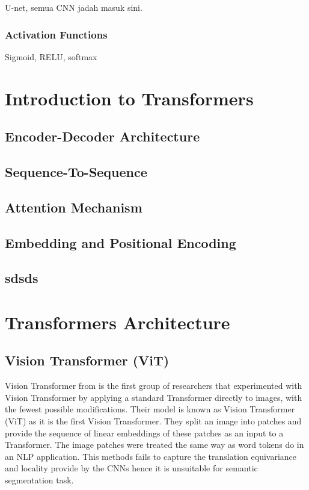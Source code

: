 U-net, semua CNN jadah masuk sini.
\subsubsection{Activation Functions}
Sigmoid, RELU, softmax

\section{Introduction to Transformers}\label{subsection:Intro to Trans}
\subsection{Encoder-Decoder Architecture}
\subsection{Sequence-To-Sequence}
\subsection{Attention Mechanism}
\subsection{Embedding and Positional Encoding}
\subsection{sdsds}\label{sasas}
\section{Transformers Architecture}
\subsection{Vision Transformer (ViT)}
Vision Transformer from \cite{16x16} is the first group of researchers that experimented with Vision Transformer by applying a standard Transformer directly to images, with the fewest possible modifications. Their model is known as Vision Transformer (ViT) as it is the first Vision Transformer. They split an image into patches and provide the sequence of linear embeddings of these patches as an input to a Transformer. The image patches were treated the same way as word tokens do in an NLP application. This methods fails to capture the  translation equivariance and locality provide by the CNNs hence it is unsuitable for semantic segmentation task.

